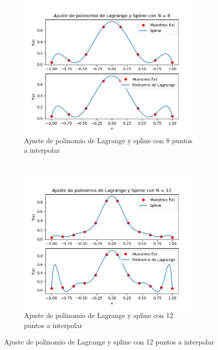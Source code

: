 \documentclass[10pt,a4paper]{article}
\begin{document}
\begin{figure}[h]
    \centering
    \begin{subfigure}[h]{0.4\textwidth}
        \includegraphics[width=\textwidth]{ajuste8.png}
        \caption{Ajuste de polinomio de Lagrange y spline con 8 puntos a interpolar}
        \label{fig8} 
    \end{subfigure}
    ~ %
    \begin{subfigure}[h]{0.4\textwidth}
        \includegraphics[width=\textwidth]{ajuste12.png}
        \caption{Ajuste de polinomio de Lagrange y spline con 12 puntos a interpolar}

\end{subfigure}
\end{figure}
\end{document}
